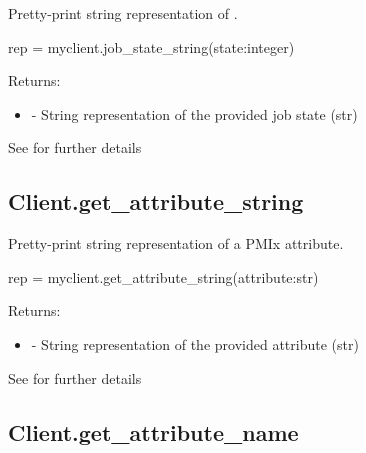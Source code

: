 \summary

Pretty-print string representation of .

\format

\pyspecificstart
\begin{codepar}
rep = myclient.job_state_string(state:integer)
\end{codepar}
\pyspecificend

\begin{arglist}
\end{arglist}

Returns:
\begin{itemize}
    \item {} - String representation of the provided job state (str)
\end{itemize}

See  for further details



\subsection{Client.get_attribute_string}

\summary

Pretty-print string representation of a \ac{PMIx} attribute.

\format

\pyspecificstart
\begin{codepar}
rep = myclient.get_attribute_string(attribute:str)
\end{codepar}
\pyspecificend

\begin{arglist}
\end{arglist}

Returns:
\begin{itemize}
    \item {} - String representation of the provided attribute (str)
\end{itemize}

See  for further details


\subsection{Client.get_attribute_name}

